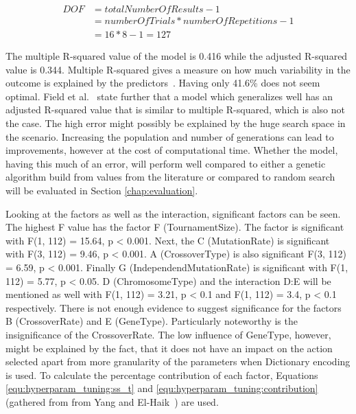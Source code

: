 \begin{equation}
	\begin{split}
		DOF & = totalNumberOfResults - 1 \\
		& = numberOfTrials * numberOfRepetitions - 1 \\
		& = 16 * 8 - 1 = 127
	\end{split}
	\label{equ:hyperparam_tuning:full_DOF}
\end{equation}

The multiple R-squared value of the model is 0.416 while the adjusted R-squared value is 0.344. Multiple R-squared gives a measure on how much variability in the outcome is explained by the predictors~\cite{field_discovering_2012}. Having only 41.6\% does not seem optimal. Field et al.~\cite{field_discovering_2012} state further that a model which generalizes well has an adjusted R-squared value that is similar to multiple R-squared, which is also not the case. The high error might possibly be explained by the huge search space in the scenario. Increasing the population and number of generations can lead to improvements, however at the cost of computational time. Whether the model, having this much of an error, will perform well compared to either a genetic algorithm build from values from the literature or compared to random search will be evaluated in Section \ref{chap:evaluation}.

Looking at the factors as well as the interaction, significant factors can be seen. The highest F value has the factor F (TournamentSize). The factor is significant with F(1, 112) = 15.64, p < 0.001. Next, the C (MutationRate) is significant with F(3, 112) = 9.46, p < 0.001. A (CrossoverType) is also significant F(3, 112) = 6.59, p < 0.001. Finally G (IndependendMutationRate) is significant with F(1, 112) = 5.77, p < 0.05. D (ChromosomeType) and the interaction D:E will be mentioned as well with F(1, 112) = 3.21, p < 0.1 and F(1, 112) = 3.4, p < 0.1 respectively. There is not enough evidence to suggest significance for the factors B (CrossoverRate) and E (GeneType). Particularly noteworthy is the insignificance of the CrossoverRate. The low influence of GeneType, however, might be explained by the fact, that it does not have an impact on the action selected apart from more granularity of the parameters when Dictionary encoding is used. To calculate the percentage contribution of each factor, Equations \ref{equ:hyperparam_tuning:ss_t} and \ref{equ:hyperparam_tuning:contribution} (gathered from from Yang and El-Haik~\cite{yang_design_2009}) are used.

